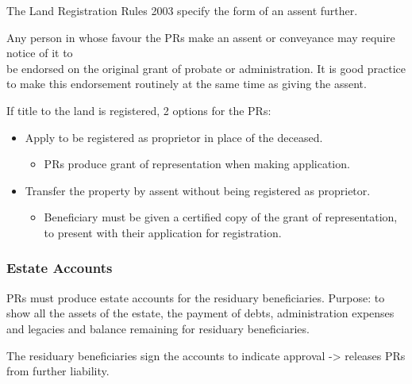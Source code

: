 \documentclass[
]{article}
\providecommand{\tightlist}{%
  \setlength{\itemsep}{0pt}\setlength{\parskip}{0pt}}
\begin{document}
The Land Registration Rules 2003 specify the form of an assent further.

Any person in whose favour the PRs make an assent or conveyance may
require notice of it to\\
be endorsed on the original grant of probate or administration. It is
good practice to make this endorsement routinely at the same time as
giving the assent.

If title to the land is registered, 2 options for the PRs:

\begin{itemize}
\tightlist
\item
  Apply to be registered as proprietor in place of the deceased.

  \begin{itemize}
  \tightlist
  \item
    PRs produce grant of representation when making application.
  \end{itemize}
\item
  Transfer the property by assent without being registered as
  proprietor.

  \begin{itemize}
  \tightlist
  \item
    Beneficiary must be given a certified copy of the grant of
    representation, to present with their application for registration.
  \end{itemize}
\end{itemize}

\hypertarget{estate-accounts}{%
\subsubsection{Estate Accounts}\label{estate-accounts}}

PRs must produce estate accounts for the residuary beneficiaries.
Purpose: to show all the assets of the estate, the payment of debts,
administration expenses and legacies and balance remaining for residuary
beneficiaries.

The residuary beneficiaries sign the accounts to indicate approval
-\textgreater{} releases PRs from further liability.
\end{document}
